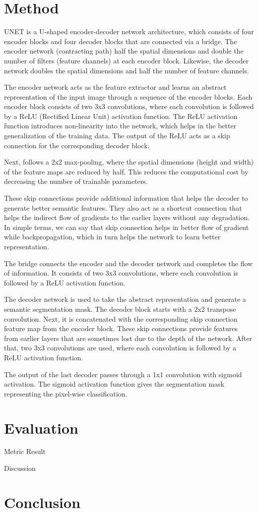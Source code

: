\documentclass[twocolumn]{article}
\begin{document}
\section{Method}
UNET is a U-shaped encoder-decoder network architecture, which consists of four encoder blocks and four decoder blocks that are connected via a bridge. The encoder network (contracting path) half the spatial dimensions and double the number of filters (feature channels) at each encoder block. Likewise, the decoder network doubles the spatial dimensions and half the number of feature channels. 

The encoder network acts as the feature extractor and learns an abstract representation of the input image through a sequence of the encoder blocks. Each encoder block consists of two 3x3 convolutions, where each convolution is followed by a ReLU (Rectified Linear Unit) activation function. The ReLU activation function introduces non-linearity into the network, which helps in the better generalization of the training data. The output of the ReLU acts as a skip connection for the corresponding decoder block.

Next, follows a 2x2 max-pooling, where the spatial dimensions (height and width) of the feature maps are reduced by half. This reduces the computational cost by decreasing the number of trainable parameters.

These skip connections provide additional information that helps the decoder to generate better semantic features. They also act as a shortcut connection that helps the indirect flow of gradients to the earlier layers without any degradation. In simple terms, we can say that skip connection helps in better flow of gradient while backpropagation, which in turn helps the network to learn better representation.

The bridge connects the encoder and the decoder network and completes the flow of information. It consists of two 3x3 convolutions, where each convolution is followed by a ReLU activation function.

The decoder network is used to take the abstract representation and generate a semantic segmentation mask. The decoder block starts with a 2x2 transpose convolution. Next, it is concatenated with the corresponding skip connection feature map from the encoder block. These skip connections provide features from earlier layers that are sometimes lost due to the depth of the network. After that, two 3x3 convolutions are used, where each convolution is followed by a ReLU activation function.

The output of the last decoder passes through a 1x1 convolution with sigmoid activation. The sigmoid activation function gives the segmentation mask representing the pixel-wise classification.

\section{Evaluation}
Metric
Result

Discussion
\section{Conclusion}
\end{document}
